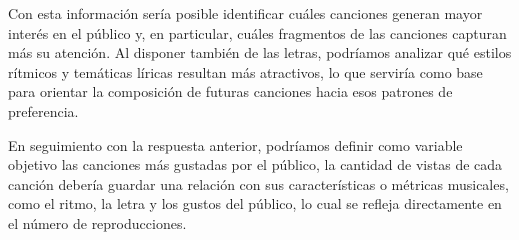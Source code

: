 \documentclass[11pt]{article}
\begin{document}
Con esta información sería posible identificar cuáles canciones generan
mayor interés en el público y, en particular, cuáles fragmentos de las
canciones capturan más su atención. Al disponer también de las letras,
podríamos analizar qué estilos rítmicos y temáticas líricas resultan más
atractivos, lo que serviría como base para orientar la composición de
futuras canciones hacia esos patrones de preferencia.

En seguimiento con la respuesta anterior, podríamos definir como
variable objetivo las canciones más gustadas por el público, la cantidad
de vistas de cada canción debería guardar una relación con sus
características o métricas musicales, como el ritmo, la letra y los
gustos del público, lo cual se refleja directamente en el número de
reproducciones.


    
    
    
\end{document}
